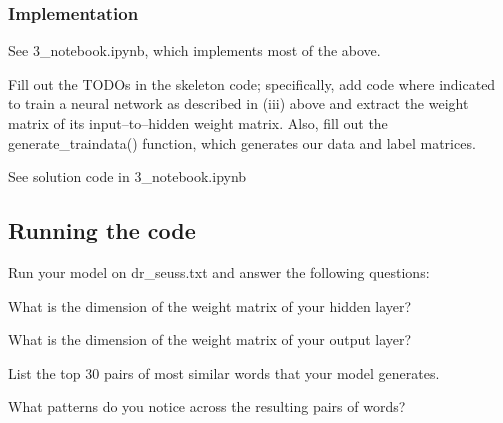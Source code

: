 \subsubsection{Implementation}

See 3_notebook.ipynb, which implements most of the above.

\problem[10]
Fill out the TODOs in the skeleton code; specifically, add code where indicated to train a neural network as described in (iii) above and extract the weight matrix of its input--to--hidden weight matrix. Also, fill out the generate\_traindata() function, which generates our data and label matrices.


\begin{solution}
See solution code in 3_notebook.ipynb %
\end{solution}

\subsection{Running the code}
Run your model on dr_seuss.txt and answer the following questions:

\problem[2]
What is the dimension of the weight matrix of your hidden layer?

\begin{solution}
\end{solution}

\problem[2]
What is the dimension of the weight matrix of your output layer?
\begin{solution}
\end{solution}

\problem[1]
List the top 30 pairs of most similar words that your model generates.
\begin{solution}
\end{solution}

\problem[2]
What patterns do you notice across the resulting pairs of words?
\begin{solution}
\end{solution}





